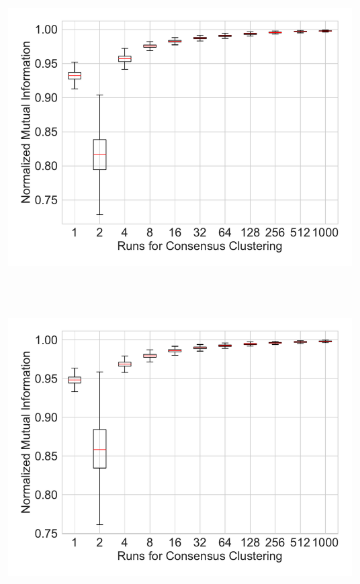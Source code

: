 \documentclass[varwidth, border=0pt]{standalone}
\begin{document}
	
	\begin{figure}
\centering
		\begin{subfigure}{0.5\linewidth}
			\includegraphics[width=\linewidth]{../../graphics/variance_impact_of_consensus_clustering_nmi_us_reg}
		\end{subfigure}~%
		\begin{subfigure}{0.5\linewidth}
			\includegraphics[width=\linewidth]{../../graphics/variance_impact_of_consensus_clustering_nmi_de_reg}
		\end{subfigure}
		\begin{subfigure}{0.5\linewidth}

\end{subfigure}
\end{figure}
\end{document}
